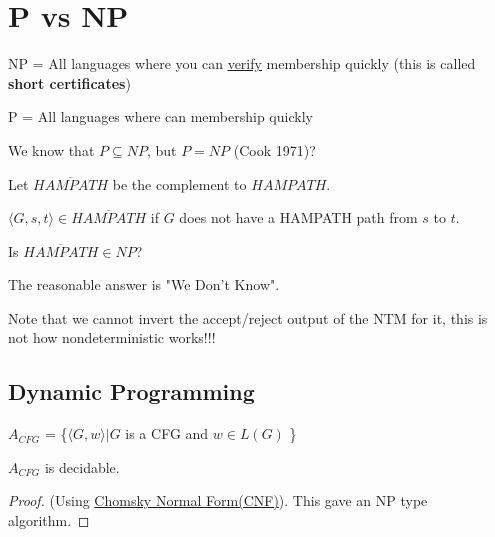 \section{P vs NP}

\begin{intuition}
    NP = All languages where you can \underline{verify} membership quickly (this is called \textbf{short certificates})

    P = All languages where can  membership quickly
\end{intuition}

We know that \(P \subseteq NP\), but \(P = NP\) (Cook 1971)? 

\begin{problem}
    Let \(\overline{HAMPATH}\) be the complement to \(HAMPATH\). 

    \(\langle G, s, t \rangle \in \overline{HAMPATH}\) if \(G\) does not have a HAMPATH path from \(s\) to \(t\).   

    Is \(\overline{HAMPATH} \in NP\)? 

    The reasonable answer is "We Don't Know". 

    Note that we cannot invert the accept/reject output of the NTM for it, this is not how nondeterministic works!!!
\end{problem}

\subsection{Dynamic Programming}
\begin{theorem}[Recall]
    \(A_{CFG}\) = \{\(\langle G, w \rangle | G\) is a CFG and \(w \in L(G)\) \} 

    \(A_{CFG}\) is decidable. 
\end{theorem}
\begin{proof}
    (Using \hyperref[theorem: Chomsky]{Chomsky Normal Form(CNF)}). This gave an NP type algorithm.
\end{proof}

